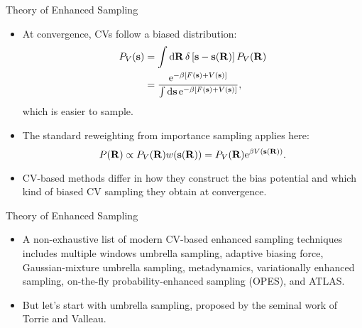 \documentclass[10pt]{beamer}
\begin{document}
\begin{frame}{Theory of Enhanced Sampling}
\begin{itemize}
\setlength\itemsep{1em}
  \item At convergence, CVs follow a biased distribution:
  \begin{align}
      P_{V}(\mathbf{s}) &= \int \mathrm{d}\mathbf{R} \, \delta
    \left[
      \mathbf{s} - \mathbf{s}(\mathbf{R})
    \right]
  P_{V}(\mathbf{R}) \nonumber\\ &=
  \frac{ \mathrm{e}^{ -\beta\left[ F(\mathbf{s}) + V(\mathbf{s}) \right] } }
    {\int\mathrm{d}\mathbf{s} \, \mathrm{e}^{ -\beta\left[ F(\mathbf{s}) + V(\mathbf{s}) \right] } },
  \end{align}
  which is easier to sample.

  \item The standard reweighting from importance sampling applies here:
  \begin{equation}
    P({\bf R}) \propto P_V({\bf R}) w({\bf s}({\bf R})) = P_V({\bf R}) \mathrm{e}^{\beta V({\bf s}({\bf R}))}.
  \end{equation}

  \item CV-based methods differ in how they construct the bias potential and which kind of biased CV sampling they obtain at convergence.
\end{itemize}
\end{frame}

\begin{frame}{Theory of Enhanced Sampling}
\begin{itemize}
\setlength\itemsep{1em}
  \item A non-exhaustive list of modern CV-based enhanced sampling techniques includes multiple windows umbrella sampling, adaptive biasing force, Gaussian-mixture umbrella sampling, metadynamics, variationally enhanced sampling, on-the-fly probability-enhanced sampling (OPES), and ATLAS.

  \item But let's start with umbrella sampling, proposed by the seminal work of Torrie and Valleau.
\end{itemize}
\end{frame}
\end{document}
